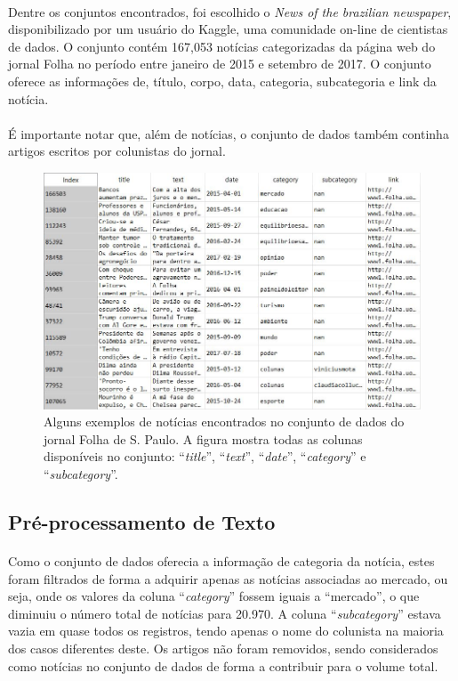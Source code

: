 \documentclass[grad,numbers]{coppe}
\begin{document}
	  	\paragraph{}Dentre os conjuntos encontrados, foi escolhido o \textit{News of the brazilian newspaper}\cite{folha-news-dataset}, disponibilizado por um usuário do Kaggle, uma comunidade on-line de cientistas de dados. O conjunto contém 167,053 notícias categorizadas da página web do jornal Folha no período entre janeiro de 2015 e setembro de 2017. O conjunto oferece as informações de, título, corpo, data, categoria, subcategoria e link da notícia.
	  	\paragraph{}É importante notar que, além de notícias, o conjunto de dados também continha artigos escritos por colunistas do jornal.
	  	\begin{figure}[h]
	  		\includegraphics[width=15cm]{folha-dataset}
	  		\caption{Alguns exemplos de notícias encontrados no conjunto de dados do jornal Folha de S. Paulo. A figura mostra todas as colunas disponíveis no conjunto: ``\textit{title}'', ``\textit{text}'', ``\textit{date}'', ``\textit{category}'' e ``\textit{subcategory}''.}
	  		\label{fig:folha-dataset-fig}
	  	\end{figure}
  		\subsection{Pré-processamento de Texto}
  			\paragraph{}Como o conjunto de dados oferecia a informação de categoria da notícia, estes foram filtrados de forma a adquirir apenas as notícias associadas ao mercado, ou seja, onde os valores da coluna ``\textit{category}'' fossem iguais a ``mercado'', o que diminuiu o número total de notícias para 20.970. A coluna ``\textit{subcategory}'' estava vazia em quase todos os registros, tendo apenas o nome do colunista na maioria dos casos diferentes deste. Os artigos não foram removidos, sendo considerados como notícias no conjunto de dados de forma a contribuir para o volume total.
\end{document}
